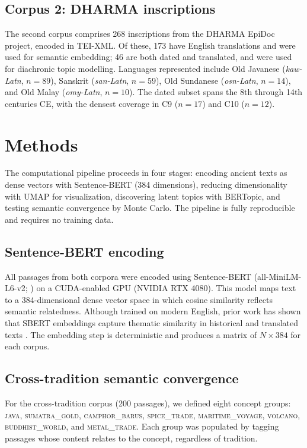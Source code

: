 \documentclass[12pt]{article}
\begin{document}
\subsection{Corpus 2: DHARMA inscriptions}

The second corpus comprises 268 inscriptions from the DHARMA EpiDoc project, encoded in TEI-XML.
Of these, 173 have English translations and were used for semantic embedding; 46 are both dated and translated, and were used for diachronic topic modelling.
Languages represented include Old Javanese (\textit{kaw-Latn}, $n = 89$), Sanskrit (\textit{san-Latn}, $n = 59$), Old Sundanese (\textit{osn-Latn}, $n = 14$), and Old Malay (\textit{omy-Latn}, $n = 10$).
The dated subset spans the 8th through 14th centuries CE, with the densest coverage in C9 ($n = 17$) and C10 ($n = 12$).


\section{Methods}

The computational pipeline proceeds in four stages: encoding ancient texts as dense vectors with Sentence-BERT (384 dimensions), reducing dimensionality with UMAP for visualization, discovering latent topics with BERTopic, and testing semantic convergence by Monte Carlo. The pipeline is fully reproducible and requires no training data.

\subsection{Sentence-BERT encoding}

All passages from both corpora were encoded using Sentence-BERT (all-MiniLM-L6-v2; \citealp{Reimers2019}) on a CUDA-enabled GPU (NVIDIA RTX 4080).
This model maps text to a 384-dimensional dense vector space in which cosine similarity reflects semantic relatedness.
Although trained on modern English, prior work has shown that SBERT embeddings capture thematic similarity in historical and translated texts \citep{Manjavacas2019}.
The embedding step is deterministic and produces a matrix of $N \times 384$ for each corpus.

\subsection{Cross-tradition semantic convergence}

For the cross-tradition corpus (200 passages), we defined eight concept groups: \textsc{java}, \textsc{sumatra\_gold}, \textsc{camphor\_barus}, \textsc{spice\_trade}, \textsc{maritime\_voyage}, \textsc{volcano}, \textsc{buddhist\_world}, and \textsc{metal\_trade}.
Each group was populated by tagging passages whose content relates to the concept, regardless of tradition.
\end{document}
